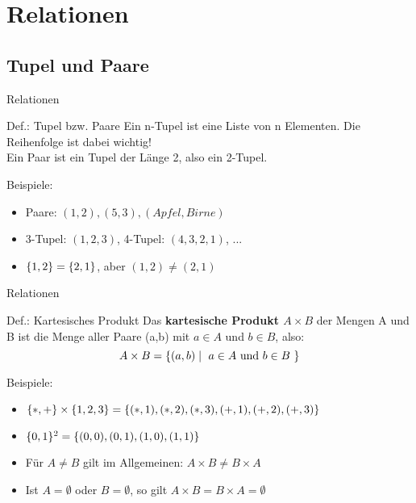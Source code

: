 \section{Relationen}
\subsection{Tupel und Paare}

	\begin{frame}{Relationen}
		\begin{block}{Def.: Tupel bzw. Paare}
			Ein n-Tupel ist eine Liste von n Elementen. Die Reihenfolge ist dabei wichtig!\\
			Ein Paar ist ein Tupel der Länge 2, also ein 2-Tupel.			
		\end{block}
		\begin{exampleblock}{Beispiele:}
			\begin{itemize}
				\item Paare: $(1,2),(5,3),(Apfel, Birne)$
				\item 3-Tupel: $(1,2,3)$, 4-Tupel: $(4,3,2,1)$, ...
				\item $\{ 1,2 \}=\{ 2,1 \}$, aber $(1,2)\neq(2,1)$
			\end{itemize}			
		\end{exampleblock}	
	\end{frame}

	\begin{frame}{Relationen}
		\begin{block}{Def.: Kartesisches Produkt}
			Das \textbf{kartesische Produkt $A \times B$} der Mengen A und B ist die Menge aller Paare (a,b) mit $a \in A$ und $b \in B$, also:
			$$A \times B = \{ (a,b) \mid \text{ $a \in A$ und $b \in B$ } \}$$
		\end{block}
	
		\begin{exampleblock}{Beispiele:}
			\begin{itemize}
				\item $\{ *, + \} \times \{ 1, 2, 3 \} = \{ (*,1), (*,2), (*,3), (+,1), (+,2), (+,3) \}$
				\item $\{ 0,1 \}^2 = \{ (0,0),(0,1),(1,0),(1,1) \}$ 
				\item Für $A \neq B$ gilt im Allgemeinen: $A \times B \neq B \times A$
				\item Ist $A = \emptyset$ oder $B = \emptyset$, so gilt $A \times B = B \times A = \emptyset$
			\end{itemize}			
		\end{exampleblock}
	\end{frame}
